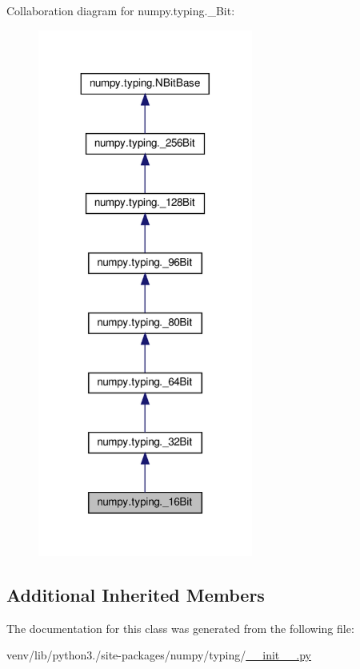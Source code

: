 Collaboration diagram for numpy.\+typing.\+\_\+Bit\+:
\nopagebreak
\begin{figure}[H]
\begin{center}
\leavevmode
\includegraphics[width=200pt]{classnumpy_1_1typing_1_1__16Bit__coll__graph}
\end{center}
\end{figure}
\subsection*{Additional Inherited Members}


The documentation for this class was generated from the following file\+:\begin{DoxyCompactItemize}
\item 
venv/lib/python3./site-\/packages/numpy/typing/\hyperlink{venv_2lib_2python3_89_2site-packages_2numpy_2typing_2____init_____8py}{\+\_\+\+\_\+init\+\_\+\+\_\+.\+py}\end{DoxyCompactItemize}

